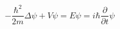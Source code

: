 \documentclass{article}
\begin{document}
\pagestyle{empty}
\[ -\frac{\hbar^2}{2m} \Delta \psi + V \psi = E \psi = i\hbar \frac{\partial}{\partial t} \psi \]
\end{document}
